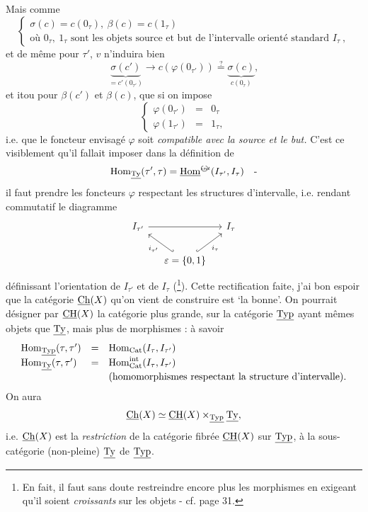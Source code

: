
Mais comme
\[
\left\{
\begin{array}{l}
\sigma(c)=c(0_\tau),\ \beta(c)=c(1_\tau)\\[1ex]
\text{où } 0_\tau,\ 1_\tau \text{ sont les objets source et but de l'intervalle orienté standard } I_\tau\ ,
\end{array}
\right.
\]
et de même pour $\tau'$, $v$ n'induira bien
\[
\underbrace{\sigma(c')}_{=c'(0_{\tau'})} \longrightarrow c(\varphi(0_{\tau'})) \overset{?}{=} \underbrace{\sigma(c)}_{c(0_\tau)},
\]
et itou pour $\beta(c')$ et $\beta(c)$, que si on impose
\[
\boxed{
\left\{
\begin{array}{lcl}
\varphi(0_{\tau'}) & = & 0_\tau\\
\varphi(1_{\tau'}) & = & 1_\tau,
\end{array}
\right.
}
\]
i.e. que le foncteur envisagé $\varphi$ soit \textit{compatible avec la source et le but.} C'est ce visiblement qu'il fallait imposer dans la définition de %
\[
\mathrm{Hom}_{\underline{\mathrm{Ty}}}(\tau',\tau)=\underline{\mathrm{Hom}}^{\text{\textcircled{$\scriptstyle int$}}}(I_{\tau'},I_\tau)\quad\text{-}
\]
il faut prendre les foncteurs $\varphi$ respectant les structures d'intervalle, i.e. rendant commutatif le diagramme
\[
\begin{tikzcd}[column sep=small]
I_{\tau'} \arrow[rr] & & I_\tau \\
& \varepsilon=\{0,1\} \arrow[ul, hook', "i_{\tau'}"] \arrow[ur, hook, "i_\tau"'] &
\end{tikzcd}
\]
définissant l'orientation de $I_{\tau'}$ et de $I_\tau$ (\footnote[10]{En fait, il faut sans doute restreindre encore plus les morphismes en exigeant qu'il soient \textit{croissants} sur les objets - cf. page 31.}). Cette rectification faite, j'ai bon espoir que la catégorie $\underline{\mathrm{Ch}}(X)$ qu'on vient de construire est `la bonne'. On pourrait désigner par $\underline{\mathrm{CH}}(X)$ la catégorie plus grande, sur la catégorie $\underline{\mathrm{Typ}}$ ayant mêmes objets que $\underline{\mathrm{Ty}}$, mais plus de morphismes : à savoir %
\[
\begin{array}{lcl}
\mathrm{Hom}_{\underline{\mathrm{Typ}}}(\tau,\tau') & = & \mathrm{Hom}_{\mathrm{Cat}}(I_\tau,I_{\tau'})\\[0.5ex]
\mathrm{Hom}_{\underline{\mathrm{Ty}}}(\tau,\tau') & = & \mathrm{Hom}^{\mathrm{int}}_{\mathrm{Cat}}(I_\tau,I_{\tau'})\\[0.5ex]
 & & \text{(homomorphismes respectant la structure d'intervalle).}
\end{array}
\]
On aura
\[
\underline{\mathrm{Ch}}(X)\simeq\underline{\mathrm{CH}}(X)\times_{\underline{\mathrm{Typ}}}\underline{\mathrm{Ty}},
\]
i.e. $\underline{\mathrm{Ch}}(X)$ est la \textit{restriction} de la catégorie fibrée $\underline{\mathrm{CH}}(X)$ sur $\underline{\mathrm{Typ}}$, à la sous-catégorie (non-pleine) $\underline{\mathrm{Ty}}$ de $\underline{\mathrm{Typ}}$.

